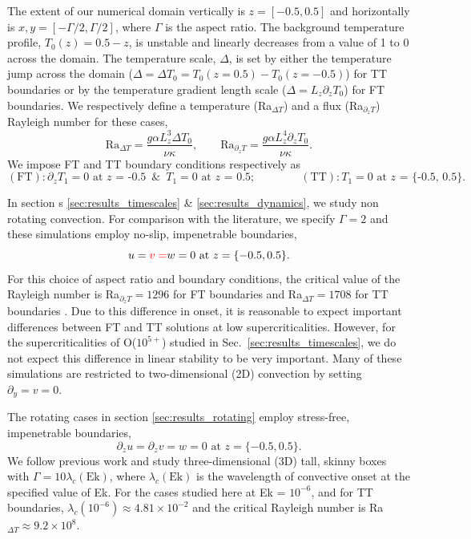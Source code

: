 \documentclass[aps, pre, onecolumn, nofootinbib, notitlepage, groupedaddress, amsfonts, amssymb, amsmath, longbibliography, superscriptaddress]{revtex4-1}
\newcommand{\ea}[1]{{\color{red} #1}}
\begin{document}
The extent of our numerical domain vertically is $z = [-0.5, 0.5]$ and horizontally is $x, y = [-\Gamma/2, \Gamma/2]$, where $\Gamma$ is the aspect ratio.
The \ea{background} temperature profile, $T_0(z) = 0.5 - z$, is unstable and linearly decreases from a value of 1 to 0 across the domain. 
The temperature scale, $\Delta$, is set by \ea{either} the temperature jump across the domain ($\Delta = \Delta T_0 =  T_0(z=0.5)-T_0(z=-0.5)$) for TT boundaries or by the temperature gradient length scale ($\Delta = L_z \partial_z T_0$) for FT boundaries.
We respectively define a temperature (Ra$_{\Delta T}$) and a flux (Ra$_{\partial_z T}$) Rayleigh number for these cases,
\begin{equation}
\text{Ra}_{\Delta T} = \frac{g \alpha L_z^3 \Delta T_0}{\nu\kappa}, \qquad 
\text{Ra}_{\partial_z T} = \frac{g \alpha L_z^4 \partial_z T_0}{\nu\kappa}.
\end{equation}
We impose FT and TT boundary conditions respectively as
\begin{equation}
(\text{FT}): \partial_z T_1 = 0 \text{ at $z$ = -0.5} \,\,\,\&\,\,\, T_1 = 0 \text{ at $z$ = 0.5};\qquad\qquad
(\text{TT}): T_1 = 0 \text{ at $z$ = \{-0.5, 0.5\}}.
\end{equation}

In section\ea{s} \ref{sec:results_timescales}\ea{\& \ref{sec:results_dynamics}}, we study \ea{non rotating convection}.
For comparison with the literature, we specify $\Gamma = 2$ and these simulations employ no-slip, impenetrable boundaries,
\begin{equation}
u = \ea{v =} w = 0 \, \, \text{at}\,\,z = \{-0.5, 0.5\}.
\label{eqn:vel_bcs}
\end{equation}
For this choice of \ea{aspect ratio and} boundary conditions, the critical value of the Rayleigh number is Ra$_{\partial_z T} = 1296$ for FT boundaries and Ra$_{\Delta T} = 1708$ for TT boundaries \cite{goluskin2016}.
Due to this difference in onset, it is reasonable to expect important differences between FT and TT solutions at low supercriticalities.
However, for the supercriticalities of O($10^{5+}$) studied in Sec.~\ref{sec:results_timescales}, we do not expect this difference in linear stability to be very important.
\ea{Many of these simulations are restricted to} two-dimensional (2D) convection \ea{by setting} $\partial_y = v = 0$.

The rotating cases in section \ref{sec:results_rotating} employ stress-free, impenetrable boundaries,
\begin{equation}
\partial_z u = \partial_z v = w = 0 \, \, \text{at}\,\,z = \{-0.5, 0.5\}.
\label{eqn:vel_bcs}
\end{equation}
We follow previous work  \cite{stellmach&all2014} and study three-dimensional (3D) tall, skinny boxes with $\Gamma = 10\lambda_c(\text{Ek})$, where $\lambda_c(\text{Ek})$ is the wavelength of convective onset at the specified value of Ek. 
For the cases studied here at Ek = $10^{-6}$, and for TT boundaries, $\lambda_c(10^{-6}) \approx 4.81 \times 10^{-2}$ and the critical Rayleigh number is Ra$_{\Delta T} \approx 9.2 \times 10^{8}$.
\end{document}
